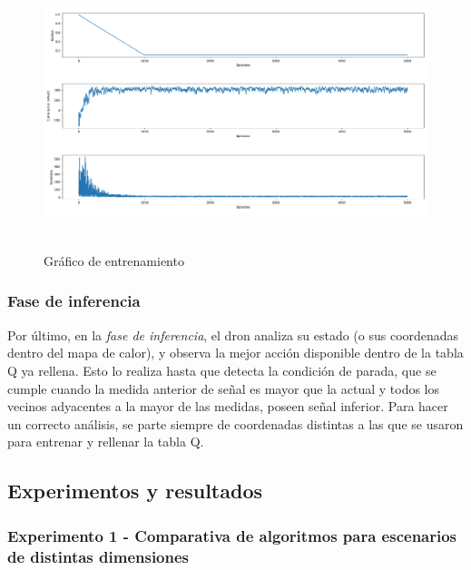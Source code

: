 \begin{figure} [t]
    \begin{center}
    \includegraphics[height=8cm]{imagenes/cap4/14_training_graph.png}
    \end{center}
    \caption[Gráfico de entrenamiento]{Gráfico de entrenamiento}
    \label{fig:training_graph}
\end{figure}

\subsubsection{Fase de inferencia}
\label{subsubsec:test}

Por último, en la \emph{fase de inferencia}, el dron analiza su estado (o sus coordenadas dentro del mapa de calor), y observa la mejor acción disponible dentro de la tabla Q ya rellena. Esto lo realiza hasta que detecta la condición de parada, que se cumple cuando la medida anterior de señal es mayor que la actual y todos los vecinos adyacentes a la mayor de las medidas, poseen señal inferior. Para hacer un correcto análisis, se parte siempre de coordenadas distintas a las que se usaron para entrenar y rellenar la tabla Q.

\subsection{Experimentos y resultados}
\label{subsec:experimentos_sf}

\subsubsection{Experimento 1 - Comparativa de algoritmos para escenarios de distintas dimensiones}
\label{subsubsec:experimentos_1}

